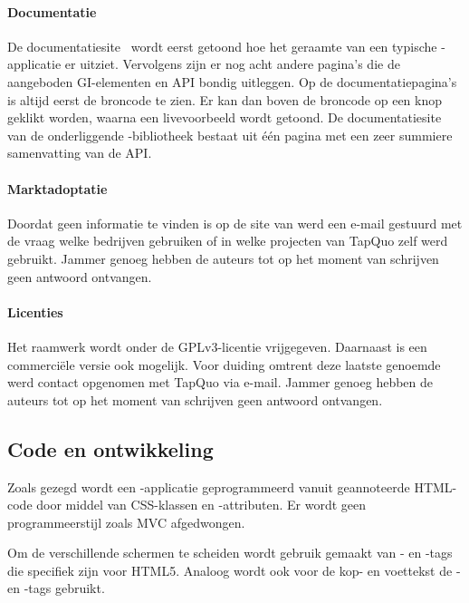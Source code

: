\paragraph{Documentatie}
De documentatiesite~\cite{Lungo2013} wordt eerst getoond hoe het geraamte van een typische \lungo{}-applicatie er uitziet.
Vervolgens zijn er nog acht andere pagina's die de aangeboden GI-elementen en API bondig uitleggen.
Op de documentatiepagina's is altijd eerst de broncode te zien.
Er kan dan boven de broncode op een knop geklikt worden, waarna een livevoorbeeld wordt getoond.
De documentatiesite~\cite{TapQuo2013c} van de onderliggende \js{}-bibliotheek bestaat uit één pagina met een zeer summiere samenvatting van de API.

\paragraph{Marktadoptatie}
Doordat geen informatie te vinden is op de site van \lungo{} werd een e-mail gestuurd met de vraag welke bedrijven \lungo{} gebruiken of in welke projecten van TapQuo zelf \lungo{} werd gebruikt.
Jammer genoeg hebben de auteurs tot op het moment van schrijven geen antwoord ontvangen.

\paragraph{Licenties}
Het raamwerk wordt onder de GPLv3-licentie vrijgegeven.
Daarnaast is een commerciële versie ook mogelijk.
Voor duiding omtrent deze laatste genoemde werd contact opgenomen met TapQuo via e-mail.
Jammer genoeg hebben de auteurs tot op het moment van schrijven geen antwoord ontvangen.

\subsection{Code en ontwikkeling}
Zoals gezegd wordt een \lungo{}-applicatie geprogrammeerd vanuit geannoteerde HTML-code door middel van CSS-klassen en -attributen.
Er wordt geen programmeerstijl zoals MVC afgedwongen.

Om de verschillende schermen te scheiden wordt gebruik gemaakt van - en -tags die specifiek zijn voor HTML5.
Analoog wordt ook voor de kop- en voettekst de - en -tags gebruikt.


